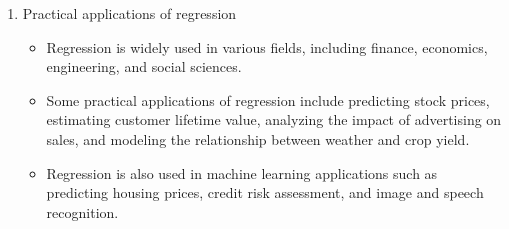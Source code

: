 \documentclass{article}
\begin{document}
\begin{enumerate}[label=\alph*)]
\item Practical applications of regression
\begin{itemize}
\item Regression is widely used in various fields, including finance, economics, engineering, and social sciences.
\item Some practical applications of regression include predicting stock prices, estimating customer lifetime value, analyzing the impact of advertising on sales, and modeling the relationship between weather and crop yield.
\item Regression is also used in machine learning applications such as predicting housing prices, credit risk assessment, and image and speech recognition.
\end{itemize}
\end{enumerate}
\end{document}
